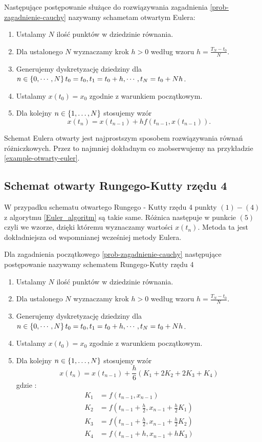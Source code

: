 \documentclass[12pt,a4paper]{report}
\begin{document}
\begin{algorithm}\label{Euler_algoritm}
Następujące postępowanie służące do rozwiązywania zagadnienia \ref{prob-zagadnienie-cauchy} nazywamy schametam otwartym Eulera:
\begin{enumerate}
\item Ustalamy $N$ ilość punktów w dziedzinie równania. 
\item Dla ustalonego $N$ wyznaczamy krok $h>0$ według wzoru $h=\frac{T_N - t_0}{N}$. 
\item Generujemy dyskretyzację dziedziny dla $ n \in \left\lbrace {0,\cdots,N} \right\rbrace  t_0 = t_0, t_1 = t_0 + h, \cdots, t_N = t_{0}+ Nh$. 
\item Ustalamy $x(t_0) = x_0$ zgodnie z warunkiem początkowym.
\item Dla kolejny $n \in \left\lbrace {1, \ldots, N} \right\rbrace$ stosujemy wzór
$$
x(t_{n}) = x(t_{n-1}) + h f(t_{n-1}, x(t_{n-1})).
$$
\end{enumerate}
\end{algorithm}
Schemat Eulera otwarty jest najprostszym sposobem rozwiązywania równań różniczkowych. Przez to najmniej dokładnym co zaobserwujemy na przykładzie \ref{example-otwarty-euler}. 
\subsection{Schemat otwarty Rungego-Kutty rzędu 4}
W przypadku schematu otwartego Rungego - Kutty rzędu 4 punkty $ (1) - (4) $ z algorytmu \ref{Euler_algoritm} są takie same. Różnica następuje w punkcie $(5)$ czyli we wzorze, dzięki któremu wyznaczamy wartości $x(t_n)$. Metoda ta jest dokładniejsza od wspomnianej wcześniej metody Eulera.
\begin{algorithm}
Dla zagadnienia początkowego \ref{prob-zagadnienie-cauchy} następujące postępowanie nazywamy schematem Rungego-Kutty rzędu 4 
\begin{enumerate}
\item Ustalamy $N$ ilość punktów w dziedzinie równania. 
\item Dla ustalonego $N$ wyznaczamy krok $h>0$ według wzoru $h=\frac{T_N-t_0}{N}$. 
\item Generujemy dyskretyzację dziedziny dla $n \in \left\lbrace {0,\cdots,N} \right\rbrace  t_0 = t_0, t_1 = t_0 + h, \cdots, t_N = t_{0}+ Nh$. 
\item Ustalamy $x(t_0) = x_0$ zgodnie z warunkiem początkowym.
\item Dla kolejny $n \in \left\lbrace {1, \ldots, N} \right\rbrace$ stosujemy wzór
$$
x(t_{n}) = x(t_{n-1}) + \frac{h}{6} ( K_1 + 2K_2 + 2K_3 + K_4 )
$$
gdzie :
$$
\begin{array}{cl}
K_1 &= f(t_{n-1},x_{n-1}) \\
K_2 &= f(t_{n-1} + \frac{h}{2}, x_{n-1} + \frac{h}{2} K_1) \\
K_3 &= f(t_{n-1} + \frac{h}{2}, x_{n-1} + \frac{h}{2} K_2) \\
K_4 &= f(t_{n-1} + h, x_{n-1} + hK_3) 
\end{array}
$$
\end{enumerate}
\end{algorithm}
\end{document}
